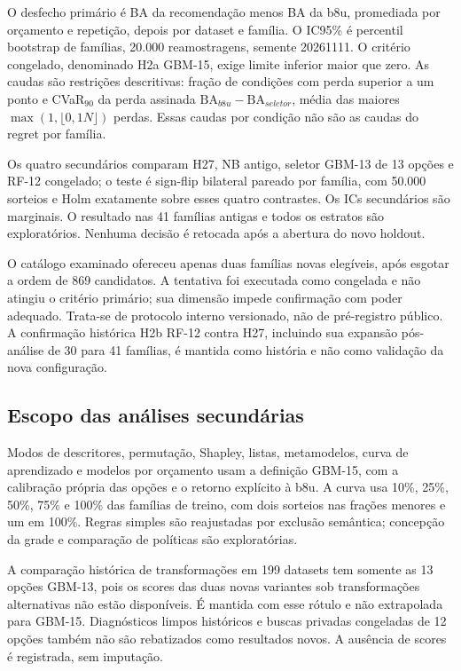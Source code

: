 O desfecho primário é BA da recomendação menos BA da b8u, promediada por orçamento e repetição, depois por dataset e família. O IC95\% é percentil bootstrap de famílias, 20.000 reamostragens, semente 20261111. O critério congelado, denominado H2a GBM-15, exige limite inferior maior que zero. As caudas são restrições descritivas: fração de condições com perda superior a um ponto e CVaR$_{90}$ da perda assinada $\mathrm{BA}_{b8u}-\mathrm{BA}_{seletor}$, média das maiores $\max(1,\lfloor0{,}1N\rfloor)$ perdas. Essas caudas por condição não são as caudas do regret por família.

Os quatro secundários comparam H27, NB antigo, seletor GBM-13 de 13 opções e RF-12 congelado; o teste é sign-flip bilateral pareado por família, com 50.000 sorteios e Holm exatamente sobre esses quatro contrastes. Os ICs secundários são marginais. O resultado nas 41 famílias antigas e todos os estratos são exploratórios. Nenhuma decisão é retocada após a abertura do novo holdout.

O catálogo examinado ofereceu apenas duas famílias novas elegíveis, após esgotar a ordem de 869 candidatos. A tentativa foi executada como congelada e não atingiu o critério primário; sua dimensão impede confirmação com poder adequado. Trata-se de protocolo interno versionado, não de pré-registro público. A confirmação histórica H2b RF-12 contra H27, incluindo sua expansão pós-análise de 30 para 41 famílias, é mantida como história e não como validação da nova configuração.

\subsection{Escopo das análises secundárias}

Modos de descritores, permutação, Shapley, listas, metamodelos, curva de aprendizado e modelos por orçamento usam a definição GBM-15, com a calibração própria das opções e o retorno explícito à b8u. A curva usa 10\%, 25\%, 50\%, 75\% e 100\% das famílias de treino, com dois sorteios nas frações menores e um em 100\%. Regras simples são reajustadas por exclusão semântica; concepção da grade e comparação de políticas são exploratórias.

A comparação histórica de transformações em 199 datasets tem somente as 13 opções GBM-13, pois os scores das duas novas variantes sob transformações alternativas não estão disponíveis. É mantida com esse rótulo e não extrapolada para GBM-15. Diagnósticos limpos históricos e buscas privadas congeladas de 12 opções também não são rebatizados como resultados novos. A ausência de scores é registrada, sem imputação.

